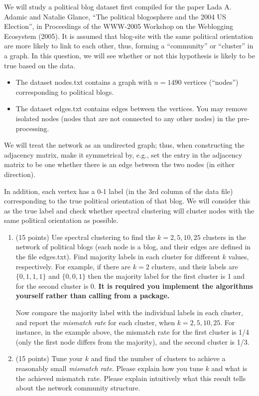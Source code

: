 \documentclass[twoside,10pt]{article}
\begin{document}
We will study a political blog dataset first compiled for the paper Lada A. Adamic and Natalie Glance, ``The political blogosphere and the 2004 US Election'', in Proceedings of the WWW-2005 Workshop on the Weblogging Ecosystem (2005). It is assumed that blog-site with the same political orientation are more likely to link to each other, thus, forming a ``community'' or ``cluster'' in a graph. In this question, we will see whether or not this hypothesis is likely to be true based on the data.
\begin{itemize}

\item The dataset \textsf{nodes.txt} contains a graph with $n = 1490$ vertices (``nodes'') corresponding to political blogs. 

\item The dataset \textsf{edges.txt} contains edges between the vertices. You may remove isolated nodes (nodes that are not connected to any other nodes) in the pre-processing. 

\end{itemize}

We will treat the network as an undirected graph; thus, when constructing the adjacency matrix, make it symmetrical by, e.g., set the entry in the adjacency matrix to be one whether there is an edge between the two nodes (in either direction). 

In addition, each vertex has a 0-1 label (in the 3rd column of the data file) corresponding to the true political orientation of that blog. We will consider this as the true label and check whether spectral clustering will cluster nodes with the same political orientation as possible. 

\begin{enumerate}

\item (15 points) Use spectral clustering to find the $k = 2, 5, 10, 25$ clusters in the network of political blogs (each node is a blog, and their edges are defined in the file \textsf{edges.txt}). Find majority labels in each cluster for different $k$ values, respectively. For example, if there are $k = 2$ clusters, and their labels are $\{0, 1, 1, 1\}$ and $\{0, 0, 1\}$ then the majority label for the first cluster is 1 and for the second cluster is 0. {\bf It is required you implement the algorithms yourself rather than calling from a package.} 

Now compare the majority label with the individual labels in each cluster, and report the {\it mismatch rate} for each cluster, when $k = 2, 5, 10, 25$. For instance, in the example above, the mismatch rate for the first cluster is 1/4 (only the first node differs from the majority), and the second cluster is 1/3. 

\item (15  points) Tune your $k$ and find the number of clusters to achieve a reasonably small {\it mismatch rate}. Please explain how you tune $k$ and what is the achieved mismatch rate. Please explain intuitively what this result tells about the network community structure.

\end{enumerate}
\end{document}
